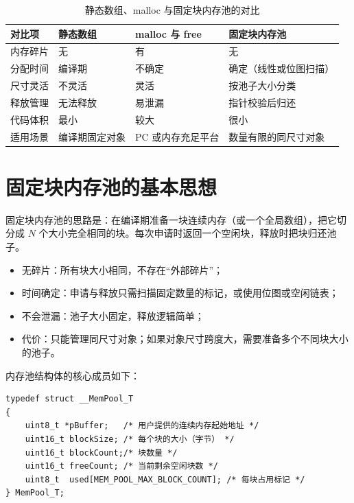\begin{table}[htbp]
\centering \caption{静态数组、malloc 与固定块内存池的对比} \label{tab:alloc-compare}
    \begin{tabular}{llll}
        \toprule
        对比项 & 静态数组 & malloc 与 free & 固定块内存池 \\
        \midrule
        内存碎片 & 无 & 有 & 无 \\
        分配时间 & 编译期 & 不确定 & 确定（线性或位图扫描） \\
        尺寸灵活 & 不灵活 & 灵活 & 按池子大小分类 \\
        释放管理 & 无法释放 & 易泄漏 & 指针校验后归还 \\
        代码体积 & 最小 & 较大 & 很小 \\
        适用场景 & 编译期固定对象 & PC 或内存充足平台 & 数量有限的同尺寸对象 \\
        \bottomrule
    \end{tabular}
\end{table}

\section{固定块内存池的基本思想}

固定块内存池的思路是：在编译期准备一块连续内存（或一个全局数组），把它切分成 $N$ 个大小完全相同的块。每次申请时返回一个空闲块，释放时把块归还池子。

\begin{itemize}
\item 无碎片：所有块大小相同，不存在“外部碎片”；
\item 时间确定：申请与释放只需扫描固定数量的标记，或使用位图或空闲链表；
\item 不会泄漏：池子大小固定，释放逻辑简单；
\item 代价：只能管理同尺寸对象；如果对象尺寸跨度大，需要准备多个不同块大小的池子。
\end{itemize}

内存池结构体的核心成员如下：

\begin{lstlisting}[style=c]
typedef struct __MemPool_T
{
    uint8_t *pBuffer;   /* 用户提供的连续内存起始地址 */
    uint16_t blockSize; /* 每个块的大小（字节） */
    uint16_t blockCount;/* 块数量 */
    uint16_t freeCount; /* 当前剩余空闲块数 */
    uint8_t  used[MEM_POOL_MAX_BLOCK_COUNT]; /* 每块占用标记 */
} MemPool_T;
\end{lstlisting}


